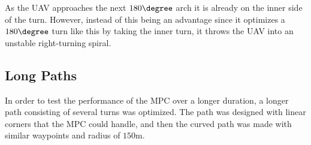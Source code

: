 As the UAV approaches the next $180\degree$ arch it is already on the inner side of the turn. However, instead of this being an advantage since it optimizes a $180\degree$ turn like this by taking the inner turn, it throws the UAV into an unstable right-turning spiral.


\subsection{Long Paths}
\label{subsec:long_paths}

In order to test the performance of the MPC over a longer duration, a longer path consisting of several turns was optimized. The path was designed with linear corners that the MPC could handle, and then the curved path was made with similar waypoints and radius of $150$m.


